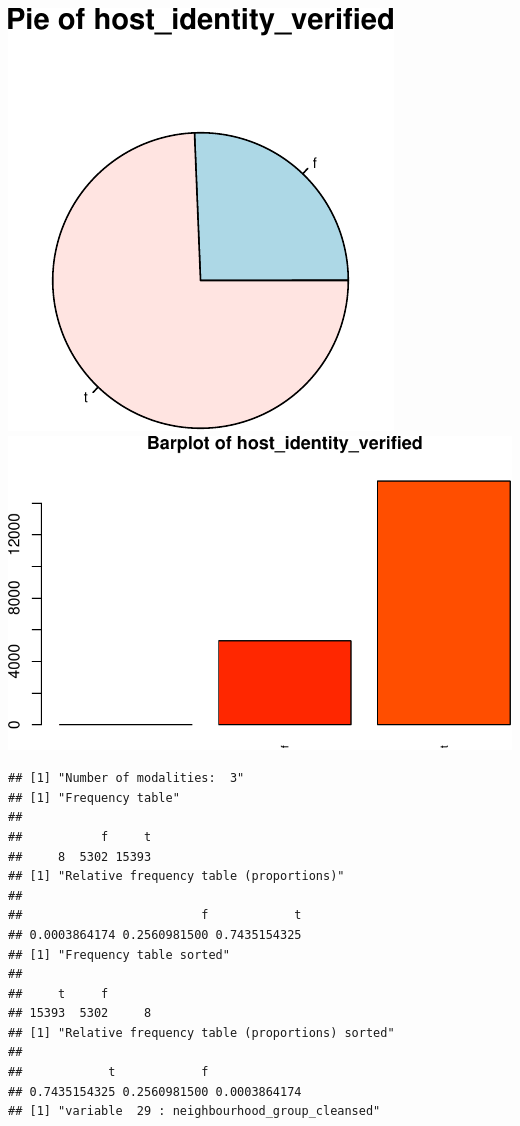 \includegraphics{anal_files/figure-latex/unnamed-chunk-7-14.pdf}
\includegraphics{anal_files/figure-latex/unnamed-chunk-7-15.pdf}

\begin{verbatim}
## [1] "Number of modalities:  3"
## [1] "Frequency table"
## 
##           f     t 
##     8  5302 15393 
## [1] "Relative frequency table (proportions)"
## 
##                         f            t 
## 0.0003864174 0.2560981500 0.7435154325 
## [1] "Frequency table sorted"
## 
##     t     f       
## 15393  5302     8 
## [1] "Relative frequency table (proportions) sorted"
## 
##            t            f              
## 0.7435154325 0.2560981500 0.0003864174 
## [1] "variable  29 : neighbourhood_group_cleansed"
\end{verbatim}

